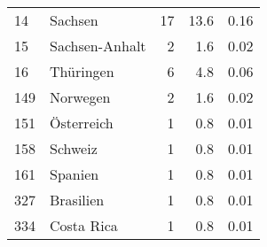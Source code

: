 \begin{longtable}{lXrrr}
        14 & \multicolumn{1}{X}{Sachsen} & %
          \num{17} &
          \num[round-mode=places,round-precision=2]{13,6} &
          \num[round-mode=places,round-precision=2]{0,16} \\

        15 & \multicolumn{1}{X}{Sachsen-Anhalt} & %
          \num{2} &
          \num[round-mode=places,round-precision=2]{1,6} &
          \num[round-mode=places,round-precision=2]{0,02} \\

        16 & \multicolumn{1}{X}{Thüringen} & %
          \num{6} &
          \num[round-mode=places,round-precision=2]{4,8} &
          \num[round-mode=places,round-precision=2]{0,06} \\

        149 & \multicolumn{1}{X}{Norwegen} & %
          \num{2} &
          \num[round-mode=places,round-precision=2]{1,6} &
          \num[round-mode=places,round-precision=2]{0,02} \\

        151 & \multicolumn{1}{X}{Österreich} & %
          \num{1} &
          \num[round-mode=places,round-precision=2]{0,8} &
          \num[round-mode=places,round-precision=2]{0,01} \\

        158 & \multicolumn{1}{X}{Schweiz} & %
          \num{1} &
          \num[round-mode=places,round-precision=2]{0,8} &
          \num[round-mode=places,round-precision=2]{0,01} \\

        161 & \multicolumn{1}{X}{Spanien} & %
          \num{1} &
          \num[round-mode=places,round-precision=2]{0,8} &
          \num[round-mode=places,round-precision=2]{0,01} \\

        327 & \multicolumn{1}{X}{Brasilien} & %
          \num{1} &
          \num[round-mode=places,round-precision=2]{0,8} &
          \num[round-mode=places,round-precision=2]{0,01} \\

        334 & \multicolumn{1}{X}{Costa Rica} & %
          \num{1} &
          \num[round-mode=places,round-precision=2]{0,8} &
          \num[round-mode=places,round-precision=2]{0,01} \\


\end{longtable}
